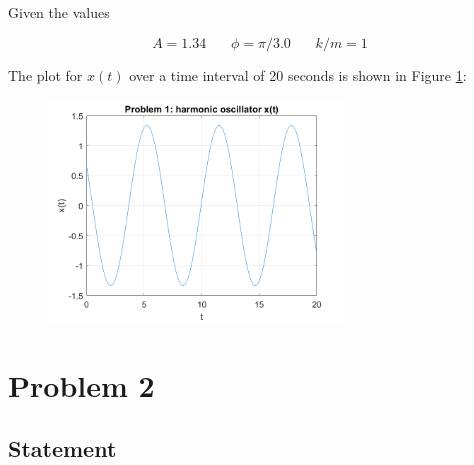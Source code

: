 \documentclass[conf]{new-aiaa}
\begin{document}
Given the values 

\begin{equation}
	A = 1.34 ~~~~~~~~\phi = \pi/3.0 ~~~~~~~~k/m = 1
\end{equation}

The plot for $x(t)$ over a time interval of 20 seconds is shown in Figure \ref{fig:xt}: 

\begin{figure}[H]
	\centering
	\includegraphics[width=0.7\textwidth]{prob1_xt.png}
	\caption{}
	\label{fig:xt}
\end{figure}



\section{Problem 2} 

\subsection{Statement} 
\begin{center}
 \\
\end{center}
\end{document}
